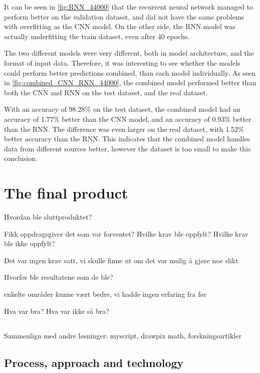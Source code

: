 It can be seen in \ref{fig:RNN_44000} that the recurrent neural network managed to perform better on the validation dataset, and did not have the same problems with overfitting as the CNN model. On the other side, the RNN model was actually underfitting the train dataset, even after 40 epochs.

The two different models were very different, both in model architecture, and the format of input data. Therefore, it was interesting to see whether the models could perform better predictions combined, than each model individually. As seen in \ref{fig:combined_CNN_RNN_44000}, the combined model performed better than both the CNN and RNN on the test dataset, and the real dataset. 

With an accuracy of 98.28\% on the test dataset, the combined model had an accuracy of 1.77\% better than the CNN model, and an accuracy of 0.93\% better than the RNN. The difference was even larger on the real dataset, with 1.52\% better accuracy than the RNN. This indicates that the combined model handles data from different sources better, however the dataset is too small to make this conclusion.


\subsection{}

\section{The final product}




Hvordan ble sluttproduktet? 


Fikk oppdragsgiver det som var forventet? 
Hvilke krav ble oppfylt? 
Hvilke krav ble ikke oppfylt?

Det var ingen krav satt, vi skulle finne ut om det var mulig å gjøre noe slikt

Hvorfor ble resultatene som de ble?

enkelte områder kunne vært bedre, vi hadde ingen erfaring fra før

Hva var bra?
Hva var ikke så bra? 


\subsection{}
Sammenlign med andre løsninger: myscript, drawpix math, forskningsartikler


\subsection{Process, approach and technology}

